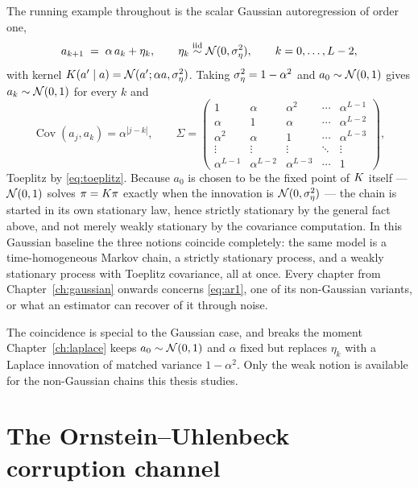 \begin{example}\label{ex:ar1}
The running example throughout is the scalar Gaussian autoregression of order
one,
\begin{equation}
  a_{k+1} \;=\; \alpha\, a_k + \eta_k ,
  \qquad
  \eta_k \stackrel{\text{iid}}{\sim} \mathcal{N}(0, \sigma_\eta^2),
  \qquad k = 0, \dots, L-2 ,
  \label{eq:ar1}
\end{equation}
with kernel $K(a' \mid a) = \mathcal{N}(a'; \alpha a, \sigma_\eta^2)$. Taking
$\sigma_\eta^2 = 1 - \alpha^2$ and $a_0 \sim \mathcal{N}(0,1)$ gives $a_k \sim \mathcal{N}(0,1)$ for
every $k$ and
\begin{equation}
  \operatorname{Cov}(a_j,a_k) = \alpha^{|j-k|}, \qquad
  \Sigma =
  \begin{pmatrix}
    1 & \alpha & \alpha^2 & \cdots & \alpha^{L-1} \\
    \alpha & 1 & \alpha & \cdots & \alpha^{L-2} \\
    \alpha^2 & \alpha & 1 & \cdots & \alpha^{L-3} \\
    \vdots & \vdots & \vdots & \ddots & \vdots \\
    \alpha^{L-1} & \alpha^{L-2} & \alpha^{L-3} & \cdots & 1
  \end{pmatrix},
  \label{eq:ar1-toeplitz}
\end{equation}
Toeplitz by \eqref{eq:toeplitz}. Because $a_0$ is chosen to be the fixed point
of $K$ itself --- $\mathcal{N}(0,1)$ solves $\pi = K \pi$ exactly when the
innovation is $\mathcal{N}(0,\sigma_\eta^2)$ --- the chain is started in its own stationary
law, hence strictly stationary by the general fact above, and not merely
weakly stationary by the covariance computation. In this Gaussian baseline the
three notions coincide completely: the same model is a time-homogeneous
Markov chain, a strictly stationary process, and a weakly stationary process
with Toeplitz covariance, all at once. Every chapter from
Chapter~\ref{ch:gaussian} onwards concerns \eqref{eq:ar1}, one of its
non-Gaussian variants, or what an estimator can recover of it through noise.
\end{example}

The coincidence is special to the Gaussian case, and breaks the moment
Chapter~\ref{ch:laplace} keeps $a_0 \sim \mathcal{N}(0,1)$ and $\alpha$ fixed but
replaces $\eta_k$ with a Laplace innovation of matched variance $1-\alpha^2$.
Only the weak notion is available for the
non-Gaussian chains this thesis studies.


\section{The Ornstein--Uhlenbeck corruption channel}\label{sec:ou}


